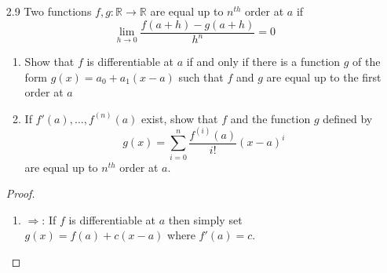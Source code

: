\begin{enumerate}
    \begin{proof}
    \begin{align*}
        0 &= \lim_{h \rightarrow 0} \frac{\left| f(a+h) - f(a) - \lambda(h) \right|}{\left|  h \right|} \\
        &= \lim_{h \rightarrow 0} \frac{\left| (f_1(a+h)-f_1(a)-\lambda_1(h), f_2(a+h)-f_2(a)-\lambda_2(h) )\right|}{\left| h \right|} \\
        &= \lim_{h \rightarrow 0} \left| \left( \frac{f_1(a+h)-f_1(a)-\lambda_1(h)}{h}, \frac{f_2(a+h)-f_2(a)-\lambda_2(h)}{h} \right) \right|
        \intertext{if and only if}
        (0,0) &= \lim_{h \rightarrow 0} \left( \frac{f_1(a+h)-f_1(a)-\lambda_1(h)}{h}, \frac{f_2(a+h)-f_2(a)-\lambda_2(h)}{h} \right)
    \end{align*}
    by Exercise 1.23, if and only if
    \begin{align*}
        0 &= \lim_{h \rightarrow 0} \frac{f_1(a+h)-f_1(a)-\lambda_1(h)}{h} \\
        \intertext{and}
        0 &= \lim_{h \rightarrow 0} \frac{f_2(a+h)-f_2(a)-\lambda_2(h)}{h}
    \end{align*}
    This establishes that \( Df(a) \) exists if and only if 
    \[
    f'(a) = \begin{bmatrix} (f_1)'(a) \\ (f_2)'(a) \end{bmatrix}
    \]
    \end{proof}
    
    \item[2.9] Two functions \( f,g: \mathbb{R} \rightarrow \mathbb{R} \) are equal up to \( n^{th} \) order at \( a \) if
    \[
    \lim_{h \rightarrow 0} \frac{f(a+h)-g(a+h)}{h^n} = 0
    \]
    \begin{enumerate}
        \item Show that \( f \) is differentiable at \( a \) if and only if there is a function \( g \) of the form \( g(x) = a_0 + a_1(x-a) \) such that \( f \) and \( g \) are equal up to the first order at \( a \)
        
        \item If \( f'(a), \ldots, f^{(n)}(a) \) exist, show that \( f \) and the function \( g \) defined by 
        \[
        g(x) = \sum_{i=0}^n \frac{f^{(i)}(a)}{i!}(x-a)^i
        \]
        are equal up to \( n^{th} \) order at \( a \).
    \end{enumerate}
    
    \begin{proof}
    \begin{enumerate}
        \item \( \Rightarrow \): If \( f \) is differentiable at \( a \) then simply set \( g(x) = f(a) + c (x-a) \) where \( f'(a) = c \).
        

\end{enumerate}
\end{proof}
\end{enumerate}
